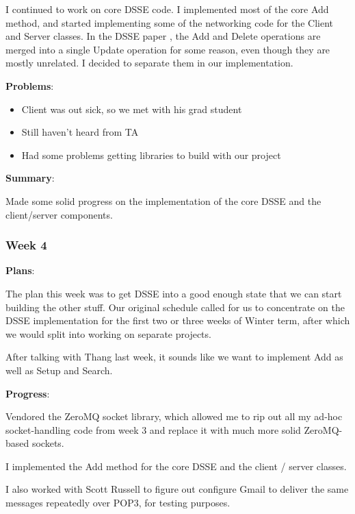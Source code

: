 I continued to work on core DSSE code. I implemented most of the core Add method, and started implementing some of the networking code for the Client and Server classes. In the DSSE paper \cite{cash14}, the Add and Delete operations are merged into a single Update operation for some reason, even though they are mostly unrelated. I decided to separate them in our implementation.


\noindent \textbf{Problems}:
\begin{itemize}
  \item Client was out sick, so we met with his grad student
  \item Still haven't heard from TA
  \item Had some problems getting libraries to build with our project
\end{itemize}

\noindent \textbf{Summary}:

Made some solid progress on the implementation of the core DSSE and the client/server components.

\subsubsection{Week 4} 

\noindent \textbf{Plans}:

The plan this week was to get DSSE into a good enough state that we can start building the other stuff. Our original schedule called for us to concentrate on the DSSE implementation for the first two or three weeks of Winter term, after which we would split into working on separate projects.

After talking with Thang last week, it sounds like we want to implement Add as well as Setup and Search.

\noindent \textbf{Progress}: 

Vendored the ZeroMQ socket library, which allowed me to rip out all my ad-hoc socket-handling code from week 3 and replace it with much more solid ZeroMQ-based sockets.
 
I implemented the Add method for the core DSSE and the client / server classes.
 
I also worked with Scott Russell to figure out configure Gmail to deliver the same messages repeatedly over POP3, for testing purposes. 

